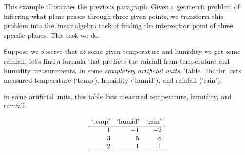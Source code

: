 \begin{example} \label{eg:inf3pts}
This example illustrates the previous paragraph.
Given a geometric problem of inferring what plane passes through three given points, we transform this problem into the linear algebra task of finding the intersection point of three specific planes.
This task we do.


Suppose we observe that at some given temperature and humidity we get some rainfall: let's find a formula that predicts the rainfall from temperature and humidity measurements.
In some \emph{completely artificial units}, Table~\ref{tbl:thr} lists measured temperature (`temp'), humidity (`humid'), and rainfall (`rain').
\begin{table}
\caption{in some artificial units, this table lists measured temperature, humidity, and rainfall.}
\label{tbl:thr}
\begin{equation*}
\begin{array}{rrr} \hline
\text{`temp'}&\text{`humid'}&\text{`rain'}\\\hline
1&-1&-2\\
3&5&8\\
2&1&1\\\hline
\end{array}
\end{equation*}
\end{table}


\end{example}
